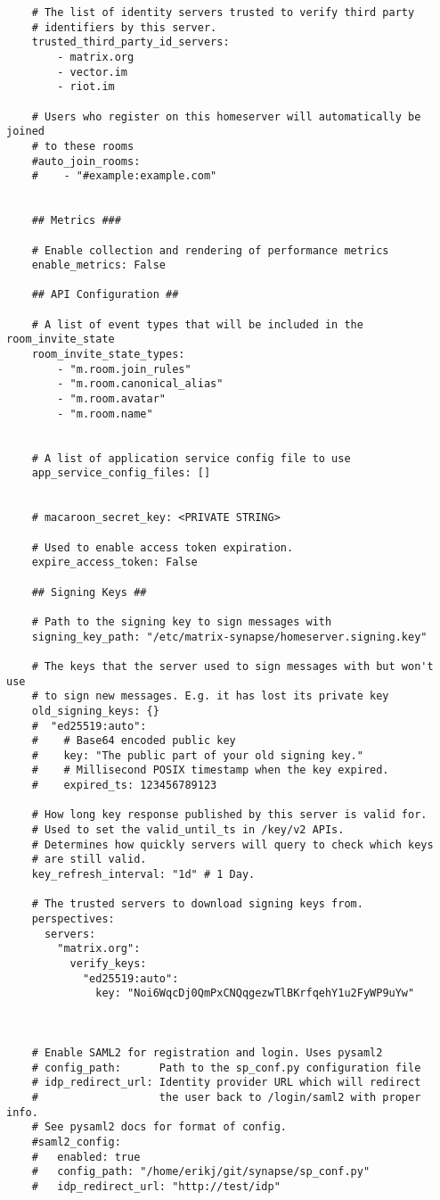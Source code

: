 \begin{lstlisting}
    # The list of identity servers trusted to verify third party
    # identifiers by this server.
    trusted_third_party_id_servers:
        - matrix.org
        - vector.im
        - riot.im
    
    # Users who register on this homeserver will automatically be joined
    # to these rooms
    #auto_join_rooms:
    #    - "#example:example.com"
    
    
    ## Metrics ###
    
    # Enable collection and rendering of performance metrics
    enable_metrics: False
    
    ## API Configuration ##
    
    # A list of event types that will be included in the room_invite_state
    room_invite_state_types:
        - "m.room.join_rules"
        - "m.room.canonical_alias"
        - "m.room.avatar"
        - "m.room.name"
    
    
    # A list of application service config file to use
    app_service_config_files: []
    
    
    # macaroon_secret_key: <PRIVATE STRING>
    
    # Used to enable access token expiration.
    expire_access_token: False
    
    ## Signing Keys ##
    
    # Path to the signing key to sign messages with
    signing_key_path: "/etc/matrix-synapse/homeserver.signing.key"
    
    # The keys that the server used to sign messages with but won't use
    # to sign new messages. E.g. it has lost its private key
    old_signing_keys: {}
    #  "ed25519:auto":
    #    # Base64 encoded public key
    #    key: "The public part of your old signing key."
    #    # Millisecond POSIX timestamp when the key expired.
    #    expired_ts: 123456789123
    
    # How long key response published by this server is valid for.
    # Used to set the valid_until_ts in /key/v2 APIs.
    # Determines how quickly servers will query to check which keys
    # are still valid.
    key_refresh_interval: "1d" # 1 Day.
    
    # The trusted servers to download signing keys from.
    perspectives:
      servers:
        "matrix.org":
          verify_keys:
            "ed25519:auto":
              key: "Noi6WqcDj0QmPxCNQqgezwTlBKrfqehY1u2FyWP9uYw"
    
    
    
    # Enable SAML2 for registration and login. Uses pysaml2
    # config_path:      Path to the sp_conf.py configuration file
    # idp_redirect_url: Identity provider URL which will redirect
    #                   the user back to /login/saml2 with proper info.
    # See pysaml2 docs for format of config.
    #saml2_config:
    #   enabled: true
    #   config_path: "/home/erikj/git/synapse/sp_conf.py"
    #   idp_redirect_url: "http://test/idp"
    

\end{lstlisting}
